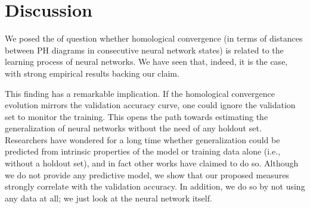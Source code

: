 \documentclass{article}
\begin{document}




\section{Discussion}
\label{sec:discussion}



We posed the of question whether homological convergence (in terms of distances between PH diagrams in consecutive neural network states) is related to the learning process of neural networks. We have seen that, indeed, it is the case, with strong empirical results backing our claim. 

This finding has a remarkable implication. If the homological convergence evolution mirrors the validation accuracy curve, one could ignore the validation set to monitor the training. This opens the path towards estimating the generalization of neural networks without the need of any holdout set. Researchers have wondered for a long time whether generalization could be predicted from intrinsic properties of the model or training data alone (i.e., without a holdout set), and in fact other works have claimed to do so. Although we do not provide any predictive model, we show that our proposed measures strongly correlate with the validation accuracy. In addition, we do so by not using any data at all; we just look at the neural network itself.%
\end{document}
